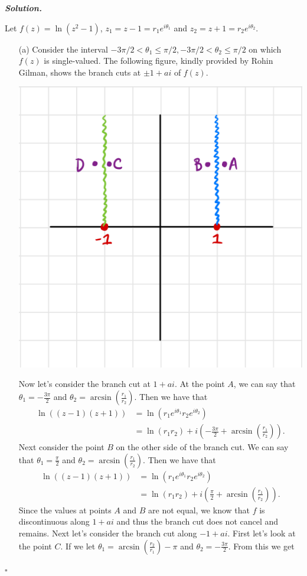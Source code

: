 \documentclass[12pt]{report}
\newenvironment{solution}[1][\it{Solution}]{\textbf{#1. } }{$\square$}
\newcommand{\paren}[1]{{\left(#1\right)}} %
\begin{document}
\begin{solution}

    \noindent
    Let $f(z) = \ln(z^2 -1)$, $z_1 = z - 1 = r_1 e^{i\theta_1}$ and $z_2 = z +1 = r_2e^{i\theta_2}.$
    \begin{enumerate}
        \item [(a)]
        Consider the interval $-3\pi/2 < \theta_1 \leq \pi / 2, - 3\pi /2 < \theta_2 \leq \pi / 2$ on which $f(z)$ is single-valued. The following figure, kindly provided by Rohin Gilman, shows the branch cuts at $\pm 1 + ai$ of $f(z)$. 
        \begin{center}
            \includegraphics[width=.5\textwidth]{figures/3a.png}
        \end{center}
        Now let's consider the branch cut at $1 + ai$. At the point $A$, we can say that $\theta_1 = -\frac{3\pi}{2}$ and $\theta_2 = \arcsin\paren{\frac{r_1}{r_2}}$. Then we have that
        \begin{align*}
            \ln((z-1)(z+1)) &= \ln(r_1e^{i\theta_1}r_2e^{i\theta_2})\\
            &=\ln(r_1r_2) + i\paren{-\frac{3\pi}{2} + \arcsin\paren{\frac{r_1}{r_2}}}.
        \end{align*}
        Next consider the point $B$ on the other side of the branch cut. We can say that $\theta_1 = \frac{\pi}{2}$ and $\theta_2 = \arcsin\paren{\frac{r_1}{r_2}}$. Then we have that
        \begin{align*}
            \ln((z-1)(z+1)) &= \ln(r_1e^{i\theta_1}r_2e^{i\theta_2})\\
            &=\ln(r_1r_2) + i\paren{\frac{\pi}{2} + \arcsin\paren{\frac{r_1}{r_2}}}.
        \end{align*}
        Since the values at points $A$ and $B$ are not equal, we know that $f$ is discontinuous along $1 + ai$ and thus the branch cut does not cancel and remains. Next let's consider the branch cut along $-1 + ai$. First let's look at the point $C$. If we let $\theta_1 = \arcsin\paren{\frac{r_2}{r_1}} - \pi$ and $\theta_2 = -\frac{3\pi}{2}$. From this we get

\end{enumerate}
\end{solution}
\end{document}
